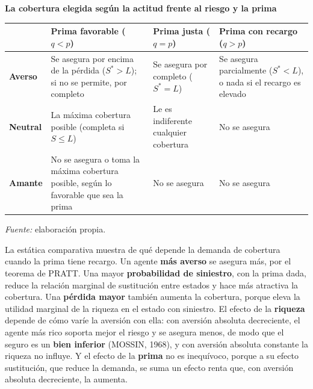 \documentclass[10pt,a4paper]{article}
\begin{document}
\begin{center}\begin{minipage}{\linewidth}\centering
{\small\textbf{La cobertura elegida según la actitud frente al riesgo y la prima}}\par\vspace{0.3em}
{\footnotesize\setlength{\tabcolsep}{4pt}\renewcommand{\arraystretch}{1.3}\def\R{\raggedright}%
\begin{tabular}{|p{1.7cm}|p{4.4cm}|p{3.8cm}|p{4.4cm}|}
\hline
 & \R\textbf{Prima favorable} ($q<p$) & \R\textbf{Prima justa} ($q=p$) & \R\textbf{Prima con recargo} ($q>p$)\tabularnewline\hline
\R\textbf{Averso} & \R Se asegura por encima de la pérdida ($S^*>L$); si no se permite, por completo & \R Se asegura por completo ($S^*=L$) & \R Se asegura parcialmente ($S^*<L$), o nada si el recargo es elevado\tabularnewline\hline
\R\textbf{Neutral} & \R La máxima cobertura posible (completa si $S\leq L$) & \R Le es indiferente cualquier cobertura & \R No se asegura\tabularnewline\hline
\R\textbf{Amante} & \R No se asegura o toma la máxima cobertura posible, según lo favorable que sea la prima & \R No se asegura & \R No se asegura\tabularnewline\hline
\end{tabular}}\par\vspace{0.3em}
{\small\textit{Fuente: }elaboración propia.}
\end{minipage}\end{center}

La estática comparativa muestra de qué depende la demanda de cobertura cuando la prima tiene recargo. Un agente \textbf{más averso} se asegura más, por el teorema de PRATT. Una mayor \textbf{probabilidad de siniestro}, con la prima dada, reduce la relación marginal de sustitución entre estados y hace más atractiva la cobertura. Una \textbf{pérdida mayor} también aumenta la cobertura, porque eleva la utilidad marginal de la riqueza en el estado con siniestro. El efecto de la \textbf{riqueza} depende de cómo varíe la aversión con ella: con aversión absoluta decreciente, el agente más rico soporta mejor el riesgo y se asegura menos, de modo que el seguro es un \textbf{bien inferior} (MOSSIN, 1968), y con aversión absoluta constante la riqueza no influye. Y el efecto de la \textbf{prima} no es inequívoco, porque a su efecto sustitución, que reduce la demanda, se suma un efecto renta que, con aversión absoluta decreciente, la aumenta.
\end{document}
